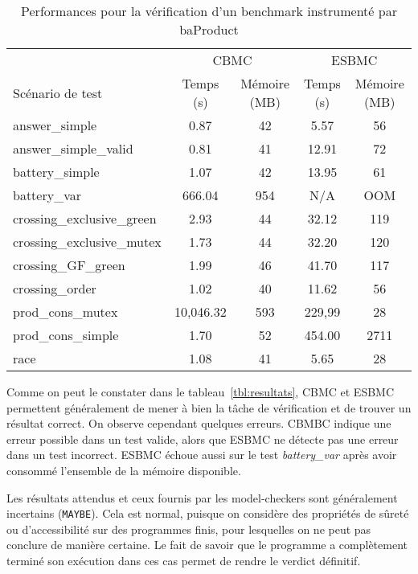 \begin{table}[]
\centering
\caption{Performances pour la vérification d'un benchmark instrumenté par baProduct}
\label{tbl:performances}
\begin{tabular}{|l|c|c|c|c|}
\hline
                           & \multicolumn{2}{c|}{CBMC} & \multicolumn{2}{c|}{ESBMC}\\
Scénario de test           & Temps (s) & Mémoire (MB) & Temps (s) & Mémoire (MB) \\
\hline
answer\_simple             & 0.87      & 42           & 5.57      & 56           \\
answer\_simple\_valid      & 0.81      & 41           & 12.91     & 72           \\
battery\_simple            & 1.07      & 42           & 13.95     & 61           \\
battery\_var               & 666.04    & 954          & N/A       & OOM          \\
crossing\_exclusive\_green & 2.93      & 44           & 32.12     & 119          \\
crossing\_exclusive\_mutex & 1.73      & 44           & 32.20     & 120          \\
crossing\_GF\_green        & 1.99      & 46           & 41.70     & 117          \\
crossing\_order            & 1.02      & 40           & 11.62     & 56           \\
prod\_cons\_mutex          & 10,046.32 & 593          & 229,99    & 28           \\
prod\_cons\_simple         & 1.70      & 52           & 454.00    & 2711         \\
race                       & 1.08      & 41           & 5.65      & 28           \\
\hline
\end{tabular}
\end{table}

Comme on peut le constater dans le tableau~\ref{tbl:resultats}, CBMC et ESBMC
permettent généralement de mener à bien la tâche de vérification et de trouver
un résultat correct. On observe cependant quelques erreurs. CBMBC indique une
erreur possible dans un test valide, alors que ESBMC ne détecte pas une erreur
dans un test incorrect. ESBMC échoue aussi sur le test \emph{battery\_var} après
avoir consommé l'ensemble de la mémoire disponible.

Les résultats attendus et ceux fournis par les model-checkers sont généralement
incertains (\texttt{MAYBE}). Cela est normal, puisque on considère des
propriétés de sûreté ou d'accessibilité sur des programmes finis, pour
lesquelles on ne peut pas conclure de manière certaine. Le fait de savoir que le
programme a complètement terminé son exécution dans ces cas permet de rendre le
verdict définitif.

